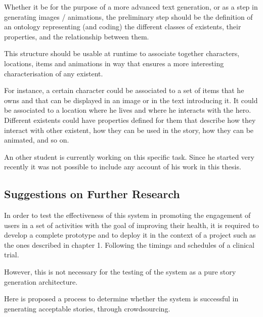 \documentclass[12pt,a4paper,oneside]{report}
\begin{document}
\bigskip

Whether it be for the purpose of a more advanced text generation, or as a step in generating images / animations, the preliminary step should be the definition of an ontology representing (and coding) the different classes of existents, their properties, and the relationship between them.

This structure should be usable at runtime to associate together characters, locations, items and animations in way that ensures a more interesting characterisation of any existent. 

For instance, a certain character could be associated to a set of items that he owns and that can be displayed in an image or in the text introducing it. It could be associated to a location where he lives and where he interacts with the hero. Different existents could have properties defined for them that describe how they interact with other existent, how they can be used in the story, how they can be animated, and so on.

\bigskip

An other student is currently working on this specific task. Since he started very recently it was not possible to include any account of his work in this thesis.

\bigskip

\subsection{Suggestions on Further Research}
In order to test the effectiveness of this system in promoting the engagement of users in a set of activities with the goal of improving their health, it is required to develop a complete prototype and to deploy it in the context of a project such as the ones described in chapter 1. Following the timings and schedules of a clinical trial.

However, this is not necessary for the testing of the system as a pure story generation architecture.

Here is proposed a process to determine whether the system is successful in generating acceptable stories, through crowdsourcing.
\end{document}
